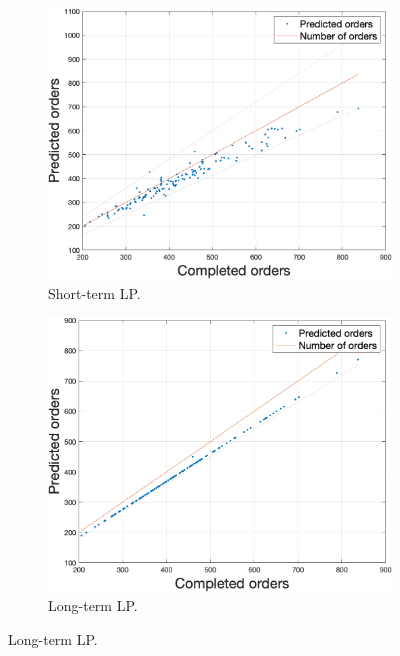     \begin{figure}[h!]
        \centering
        \begin{subfigure}[b]{0.49\textwidth}
            \includegraphics[width=\textwidth]{figures/expCompLP.png}
            \caption{Short-term LP.}
            \label{fig:stlpres}
        \end{subfigure}
        \begin{subfigure}[b]{0.49\textwidth}
            \includegraphics[width=\textwidth]{figures/expCompLTLP.png}
            \caption{Long-term LP.}
            \label{fig:eltlpres}
        \end{subfigure}

\end{figure}

